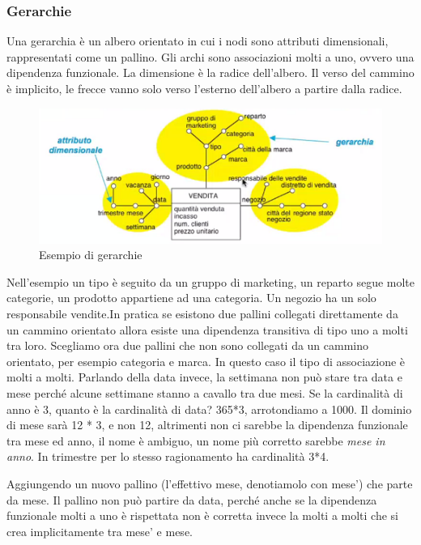\subsubsection{Gerarchie}
Una gerarchia è un albero orientato in cui i nodi sono attributi dimensionali, rappresentati come un pallino. Gli archi sono associazioni molti a uno, ovvero una dipendenza funzionale.\newline
La dimensione è la radice dell'albero.\newline
Il verso del cammino è implicito, le frecce vanno solo verso l'esterno dell'albero a partire dalla radice.
\begin{figure}[H]
	\begin{center}
		\includegraphics[width=0.5\linewidth]{img/ger.PNG}
		\caption{Esempio di gerarchie}
	\end{center}
\end{figure}
\noindent Nell'esempio un tipo è seguito da un gruppo di marketing, un reparto segue molte categorie, un prodotto appartiene ad una categoria. Un negozio ha un solo responsabile vendite.\newline In pratica se esistono due pallini collegati direttamente da un cammino orientato allora esiste una dipendenza transitiva di tipo uno a molti tra loro.\newline
Scegliamo ora due pallini che non sono collegati da un cammino orientato, per esempio categoria e marca. In questo caso il tipo di associazione è molti a molti.\newline
Parlando della data invece, la settimana non può stare tra data e mese perché alcune settimane stanno a cavallo tra due mesi.\newline
Se la cardinalità di anno è 3, quanto è la cardinalità di data? 365*3, arrotondiamo a 1000. Il dominio di mese sarà 12 * 3, e non 12, altrimenti non ci sarebbe la dipendenza funzionale tra mese ed anno, il nome è ambiguo, un nome più corretto sarebbe \textit{mese in anno}. In trimestre per lo stesso ragionamento ha cardinalità 3*4.
\begin{question}
	Aggiungendo un nuovo pallino (l'effettivo mese, denotiamolo con mese') che parte da mese. Il pallino non può partire da data, perché anche se la dipendenza funzionale molti a uno è rispettata non è corretta invece la molti a molti che si crea implicitamente tra mese' e mese.
\end{question}
